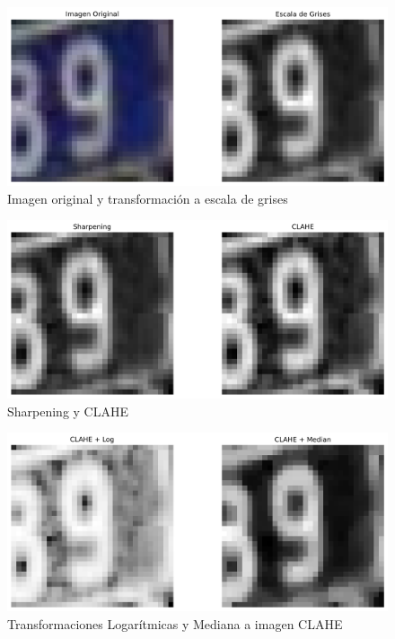 \documentclass[journal]{IEEEtran}
\begin{document}
\begin{figure}[H]
        \centering
        \includegraphics[width=\linewidth]{figures/row_1_images.png}
        \caption{Imagen original y transformación a escala de grises}
        \label{fig:row_1}
\end{figure}

\begin{figure}[H]
        \centering
        \includegraphics[width=\linewidth]{figures/row_2_images.png}
        \caption{Sharpening y CLAHE}
        \label{fig:row_2}
\end{figure}

\begin{figure}[H]
        \centering
        \includegraphics[width=\linewidth]{figures/row_3_images.png}
        \caption{Transformaciones Logarítmicas y Mediana a imagen CLAHE}
        \label{fig:row_3}
\end{figure}
\end{document}
